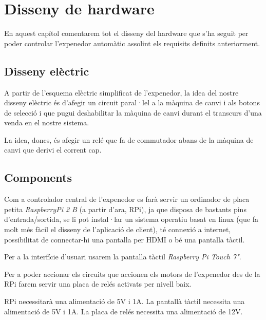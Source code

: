\chapter{Disseny de hardware}\label{chapter:disseny de hardware}
En aquest capítol comentarem tot el disseny del hardware que s'ha seguit per poder controlar l'expenedor automàtic assolint els requisits definits anteriorment.

\section{Disseny elèctric}
A partir de l'esquema elèctric simplificat de l'expenedor, la idea del nostre disseny elèctric és d'afegir un circuit paral·lel a la màquina de canvi i als botons de selecció i que pugui deshabilitar la màquina de canvi durant el transcurs d'una venda en el nostre sistema. 

La idea, doncs, és afegir un relé que fa de commutador abans de la màquina de canvi que derivi el corrent cap.



\section{Components}
Com a controlador central de l'expenedor es farà servir un ordinador de placa petita \textit{RaspberryPi 2 B} (a partir d'ara, RPi), ja que disposa de bastants pins d'entrada/sortida, se li pot instal·lar un sistema operatiu basat en linux (que fa molt més fàcil el disseny de l'aplicació de client), té connexió a internet, possibilitat de connectar-hi una pantalla per HDMI o bé una pantalla tàctil.

Per a la interfície d'usuari usarem la pantalla tàctil \textit{Raspberry Pi Touch 7"}.

Per a poder accionar els circuits que accionen els motors de l'expenedor des de la RPi farem servir una placa de relés activats per nivell baix.



RPi necessitarà una alimentació de 5V i 1A.
La pantallà tàctil necessita una alimentació de 5V i 1A.
La placa de relés necessita una alimentació de 12V.
